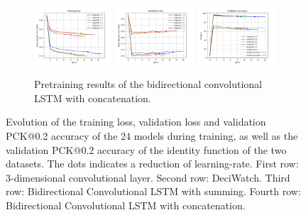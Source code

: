 \documentclass[./main.tex]{subfiles}
\begin{document}
\begin{figure}[htbp]
    \begin{subfigure}[b]{\textwidth}
        \centering
        \includegraphics[width=0.32\textwidth]{./entities/pretrained/unipose2/train_losses.png}
        \includegraphics[width=0.32\textwidth]{./entities/pretrained/unipose2/val_losses.png}
        \includegraphics[width=0.32\textwidth]{./entities/pretrained/unipose2/val_accs.png}
        \caption{Pretraining results of the bidirectional convolutional LSTM with concatenation.}
    \end{subfigure}
    \hfill
    
    \caption{Evolution of the training loss, validation loss and validation PCK@0.2 accuracy of the 24 models during training, as well as the validation PCK@0.2 accuracy of the identity function of the two datasets. The dots indicates a reduction of learning-rate. First row: 3-dimensional convolutional layer. Second row: DeciWatch. Third row: Bidirectional Convolutional LSTM with summing. Fourth row: Bidirectional Convolutional LSTM with concatenation.}
    \label{fig:pretraining_res}
\end{figure}
\end{document}

